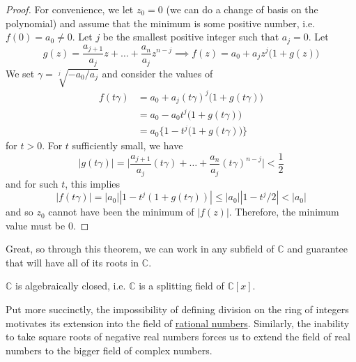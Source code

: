 \begin{proof}
    For convenience, we let $z_0 = 0$ (we can do a change of basis on the polynomial) and assume that the minimum is some positive number, i.e. $f(0) = a_0 \neq 0$. Let $j$ be the smallest positive integer such that $a_j = 0$. Let 
    \begin{equation}
      g(z) = \frac{a_{j+1}}{a_j} z + \ldots + \frac{a_n}{a_j} z^{n-j} \implies f(z) = a_0 + a_j z^j \big( 1 + g(z) \big) 
    \end{equation}
    We set $\gamma = \sqrt[j]{-a_0/a_j}$ and consider the values of 
    \begin{align}
      f(t \gamma) & = a_0 + a_j (t\gamma)^j \big( 1 + g(t\gamma) \big) \\
                  & = a_0 - a_0 t^j \big(1 + g(t \gamma) \big) \\
                  & = a_0 \big\{ 1 - t^j \big(1 + g(t \gamma) \big) \big\}
    \end{align} 
    for $t > 0$. For $t$ sufficiently small, we have 
    \begin{equation}
      |g(t \gamma)| = \bigg| \frac{a_{j+1}}{a_j} (t \gamma) + \ldots + \frac{a_n}{a_j} (t \gamma)^{n-j} \bigg| < \frac{1}{2} 
    \end{equation}
    and for such $t$, this implies 
    \begin{equation}
      |f(t \gamma)| = |a_0| |1 - t^j (1 + g(t \gamma))| \leq |a_0| |1 - t^j/2| < |a_0|
    \end{equation}
    and so $z_0$ cannot have been the minimum of $|f(z)|$. Therefore, the minimum value must be $0$.  
  \end{proof}

  Great, so through this theorem, we can work in any subfield of $\mathbb{C}$ and guarantee that will have all of its roots in $\mathbb{C}$. 

  \begin{corollary}
    \label{thm:c-is-algebraically-closed}
    $\mathbb{C}$ is algebraically closed, i.e. $\mathbb{C}$ is a splitting field of $\mathbb{C}[x]$. 
  \end{corollary}

  Put more succinctly, the impossibility of defining division on the ring of integers motivates its extension into the field of \hyperref[def:rational-numbers]{rational numbers}. Similarly, the inability to take square roots of negative real numbers forces us to extend the field of real numbers to the bigger field of complex numbers. 

